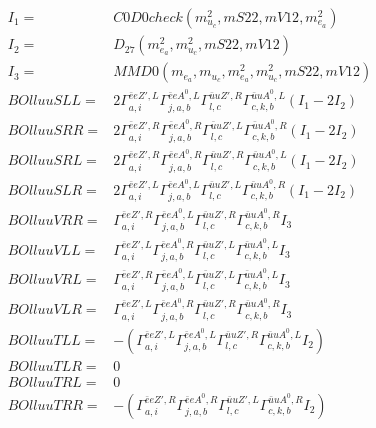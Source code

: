 \documentclass[A4,landscape]{article}
\begin{document}
\begin{align} 
I_1 = & C0D0check(m^2_{u_{{c}}}, mS22, mV12, m^2_{e_{{a}}}) \\ 
I_2 = & D_{27}(m^2_{e_{{a}}}, m^2_{u_{{c}}}, mS22, mV12) \\ 
I_3 = & MMD0(m_{e_{{a}}}, m_{u_{{c}}}, m^2_{e_{{a}}}, m^2_{u_{{c}}}, mS22, mV12) \\ 
  BOlluuSLL= & 2  \Gamma^{\bar{e}e {Z'} ,L}_{a, i} \Gamma^{\bar{e}e A^0 ,L}_{j, a, b} \Gamma^{\bar{u}u {Z'} ,R}_{l, c} \Gamma^{\bar{u}u A^0 ,L}_{c, k, b} (I_1 - 2 I_2) \\ 
  BOlluuSRR= & 2  \Gamma^{\bar{e}e {Z'} ,R}_{a, i} \Gamma^{\bar{e}e A^0 ,R}_{j, a, b} \Gamma^{\bar{u}u {Z'} ,L}_{l, c} \Gamma^{\bar{u}u A^0 ,R}_{c, k, b} (I_1 - 2 I_2) \\ 
  BOlluuSRL= & 2  \Gamma^{\bar{e}e {Z'} ,R}_{a, i} \Gamma^{\bar{e}e A^0 ,R}_{j, a, b} \Gamma^{\bar{u}u {Z'} ,R}_{l, c} \Gamma^{\bar{u}u A^0 ,L}_{c, k, b} (I_1 - 2 I_2) \\ 
  BOlluuSLR= & 2  \Gamma^{\bar{e}e {Z'} ,L}_{a, i} \Gamma^{\bar{e}e A^0 ,L}_{j, a, b} \Gamma^{\bar{u}u {Z'} ,L}_{l, c} \Gamma^{\bar{u}u A^0 ,R}_{c, k, b} (I_1 - 2 I_2) \\ 
  BOlluuVRR= &  \Gamma^{\bar{e}e {Z'} ,R}_{a, i} \Gamma^{\bar{e}e A^0 ,L}_{j, a, b} \Gamma^{\bar{u}u {Z'} ,R}_{l, c} \Gamma^{\bar{u}u A^0 ,R}_{c, k, b} I_3 \\ 
  BOlluuVLL= &  \Gamma^{\bar{e}e {Z'} ,L}_{a, i} \Gamma^{\bar{e}e A^0 ,R}_{j, a, b} \Gamma^{\bar{u}u {Z'} ,L}_{l, c} \Gamma^{\bar{u}u A^0 ,L}_{c, k, b} I_3 \\ 
  BOlluuVRL= &  \Gamma^{\bar{e}e {Z'} ,R}_{a, i} \Gamma^{\bar{e}e A^0 ,L}_{j, a, b} \Gamma^{\bar{u}u {Z'} ,L}_{l, c} \Gamma^{\bar{u}u A^0 ,L}_{c, k, b} I_3 \\ 
  BOlluuVLR= &  \Gamma^{\bar{e}e {Z'} ,L}_{a, i} \Gamma^{\bar{e}e A^0 ,R}_{j, a, b} \Gamma^{\bar{u}u {Z'} ,R}_{l, c} \Gamma^{\bar{u}u A^0 ,R}_{c, k, b} I_3 \\ 
  BOlluuTLL= & -( \Gamma^{\bar{e}e {Z'} ,L}_{a, i} \Gamma^{\bar{e}e A^0 ,L}_{j, a, b} \Gamma^{\bar{u}u {Z'} ,R}_{l, c} \Gamma^{\bar{u}u A^0 ,L}_{c, k, b} I_2) \\ 
  BOlluuTLR= & 0 \\ 
  BOlluuTRL= & 0 \\ 
  BOlluuTRR= & -( \Gamma^{\bar{e}e {Z'} ,R}_{a, i} \Gamma^{\bar{e}e A^0 ,R}_{j, a, b} \Gamma^{\bar{u}u {Z'} ,L}_{l, c} \Gamma^{\bar{u}u A^0 ,R}_{c, k, b} I_2) \\ 
\end{align} 
\end{document}
